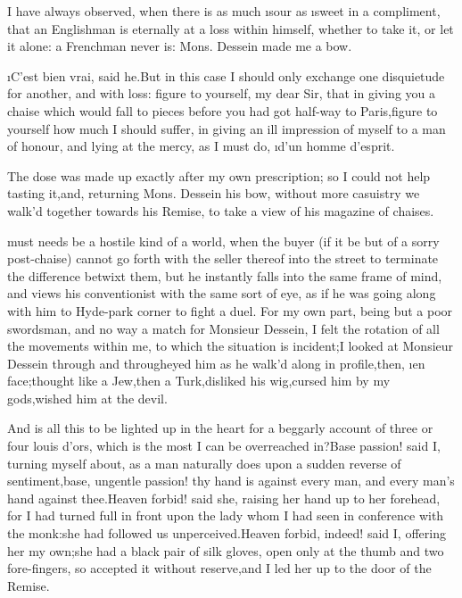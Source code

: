 \documentclass[twoside]{article}
\begin{document}
I have always observed, when there is as much \i{sour} as \i{sweet} in a
compliment, that an Englishman is eternally at a loss within himself,
whether to take it, or let it alone: a Frenchman never is: Mons. Dessein
made me a bow.

\i{C’est bien vrai}, said he.\tsk But in this case I should only exchange one
disquietude for another, and with loss: figure to yourself, my dear Sir,
that in giving you a chaise which would fall to pieces before you had got
half-way to Paris,\tsk figure to yourself how much I should suffer, in giving
an ill impression of myself to a man of honour, and lying at the mercy,
as I must do, \i{d’un homme d’esprit}.

The dose was made up exactly after my own prescription; so I could not
help tasting it,\tsk and, returning Mons. Dessein his bow, without more
casuistry we walk’d together towards his Remise, to take a view of his
magazine of chaises.






 must needs be a hostile kind of a world, when the buyer (if it be but
of a sorry post-chaise) cannot go forth with the seller thereof into the
street to terminate the difference betwixt them, but he instantly falls
into the same frame of mind, and views his conventionist with the same
sort of eye, as if he was going along with him to Hyde-park corner to
fight a duel.  For my own part, being but a poor swordsman, and no way a
match for Monsieur Dessein, I felt the rotation of all the movements
within me, to which the situation is incident;\tsk I looked at Monsieur
Dessein through and through\tsk eyed him as he walk’d along in profile,\tsk then,
\i{en face};\tsk thought like a Jew,\tsk then a Turk,\tsk disliked his wig,\tsk cursed him
by my gods,\tsk wished him at the devil.\tsk 

\tsk And is all this to be lighted up in the heart for a beggarly account of
three or four louis d’ors, which is the most I can be overreached
in?\tsk Base passion! said I, turning myself about, as a man naturally does
upon a sudden reverse of sentiment,\tsk base, ungentle passion! thy hand is
against every man, and every man’s hand against thee.\tsk Heaven forbid! said
she, raising her hand up to her forehead, for I had turned full in front
upon the lady whom I had seen in conference with the monk:\tsk she had
followed us unperceived.\tsk Heaven forbid, indeed! said I, offering her my
own;\tsk she had a black pair of silk gloves, open only at the thumb and two
fore-fingers, so accepted it without reserve,\tsk and I led her up to the
door of the Remise.
\end{document}
